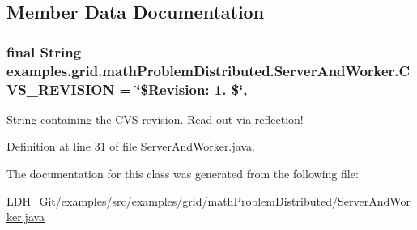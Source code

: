 \subsection{Member Data Documentation}
\hypertarget{classexamples_1_1grid_1_1math_problem_distributed_1_1_server_and_worker_a5ac8aaa86ffce36a819b307b1bcb9be6}{
\subsubsection[{C\-V\-S\-\_\-\-R\-E\-V\-I\-S\-I\-O\-N}]{\setlength{\rightskip}{0pt plus 5cm}final String examples.\-grid.\-math\-Problem\-Distributed.\-Server\-And\-Worker.\-C\-V\-S\-\_\-\-R\-E\-V\-I\-S\-I\-O\-N = \char`\"{}\$Revision\-: 1. \$\char`\"{}\hspace{0.3cm}{\ttfamily [static]}, {\ttfamily [private]}}}\label{classexamples_1_1grid_1_1math_problem_distributed_1_1_server_and_worker_a5ac8aaa86ffce36a819b307b1bcb9be6}
String containing the C\-V\-S revision. Read out via reflection! 

Definition at line 31 of file Server\-And\-Worker.\-java.



The documentation for this class was generated from the following file\-:\begin{DoxyCompactItemize}
\item 
L\-D\-H\-\_\-\-Git/examples/src/examples/grid/math\-Problem\-Distributed/\hyperlink{math_problem_distributed_2_server_and_worker_8java}{Server\-And\-Worker.\-java}\end{DoxyCompactItemize}
